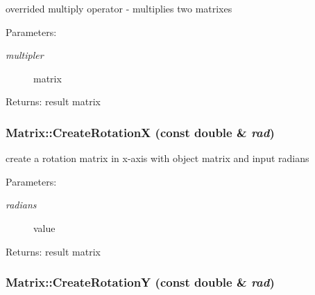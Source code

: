 overrided multiply operator - multiplies two matrixes \begin{Desc}
\item[Parameters:]
\begin{description}
\item[{\em multipler}]matrix \end{description}
\end{Desc}
\begin{Desc}
\item[Returns:]result matrix \end{Desc}
\hypertarget{class_matrix_7e7fc915d008dd66b83fc539d7b41b08}{
\subsubsection[CreateRotationX]{ Matrix::CreateRotationX (const double \& {\em rad})}}
\label{class_matrix_7e7fc915d008dd66b83fc539d7b41b08}


create a rotation matrix in x-axis with object matrix and input radians \begin{Desc}
\item[Parameters:]
\begin{description}
\item[{\em radians}]value \end{description}
\end{Desc}
\begin{Desc}
\item[Returns:]result matrix \end{Desc}
\hypertarget{class_matrix_30c0e3b3dded5121c9b2bc7a302d5261}{
\subsubsection[CreateRotationY]{ Matrix::CreateRotationY (const double \& {\em rad})}}
\label{class_matrix_30c0e3b3dded5121c9b2bc7a302d5261}



